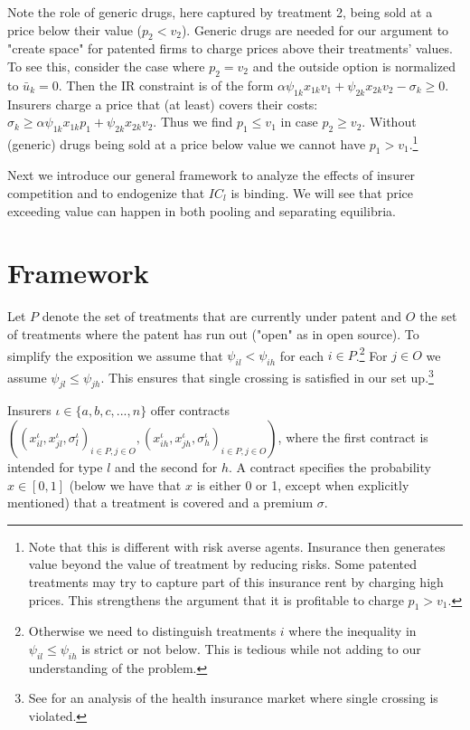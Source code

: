\documentclass[12pt,english,a4paper]{article}
\begin{document}
Note the role of generic drugs, here captured by treatment 2, being sold at a price below their value (\(p_2 < v_2\)). Generic drugs are needed for our argument to "create space" for patented firms to charge prices above their treatments' values. To see this, consider the case where \(p_2=v_2\) and the outside option is normalized to \(\bar u_k = 0\). Then the IR constraint is of the form \(\alpha \psi_{1k} x_{1k} v_1 + \psi_{2k}x_{2k}v_2 - \sigma_k \geq 0\). Insurers charge a price that (at least) covers their costs: \(\sigma_k \geq \alpha \psi_{1k} x_{1k} p_1 + \psi_{2k} x_{2k} v_2\). Thus we find \(p_1 \leq v_1\) in case \(p_2 \geq v_2\). Without (generic) drugs being sold at a price below value we cannot have \(p_1 > v_1\).\footnote{Note that this is different with risk averse agents. Insurance then generates value beyond the value of treatment by reducing risks. Some patented treatments may try to capture part of this insurance rent by charging high prices. This strengthens the argument that it is profitable to charge \(p_1>v_1\).}

Next we introduce our general framework to analyze the effects of insurer competition and to endogenize that \(IC_l\) is binding. We will see that price exceeding value can happen in both pooling and separating equilibria.

\section{Framework}
\label{sec:orgceb53f6}

Let \(P\) denote the set of treatments that are currently under patent and \(O\) the set of treatments where the patent has run out ("open" as in open source). To simplify the exposition we assume that \(\psi_{il}<\psi_{ih}\) for each \(i \in P\).\footnote{Otherwise we need to distinguish treatments \(i\) where the inequality in \(\psi_{il} \leq \psi_{ih}\) is strict or not below. This is tedious while not adding to our understanding of the problem.} For \(j \in O\) we assume \(\psi_{jl} \leq \psi_{jh}\). This ensures that single crossing is satisfied in our set up.\footnote{See \cite{BooneS13} for an analysis of the health insurance market where single crossing is violated.}

Insurers \(\iota \in \{a,b,c,...,n\}\) offer contracts \(((x_{il}^{\iota},x_{jl}^{\iota},\sigma_l^{\iota})_{i \in P, j \in O},(x_{ih}^{\iota},x_{jh}^{\iota},\sigma_h^{\iota})_{i \in P, j \in O})\), where the first contract is intended for type \(l\) and the second for \(h\). A contract specifies the probability \(x \in [0,1]\) (below we have that \(x\) is either 0 or 1, except when explicitly mentioned) that a treatment is covered and a premium \(\sigma\).
\end{document}
